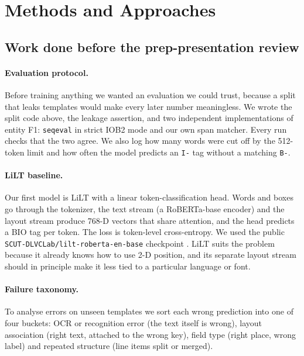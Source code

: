 \documentclass[11pt,a4paper]{article}
\begin{document}
\section{Methods and Approaches}

\subsection{Work done before the prep-presentation review}
\label{sec:before}

\paragraph{Evaluation protocol.} Before training anything we wanted an evaluation we could trust, because a split that leaks templates would make every later number meaningless. We wrote the split code above, the leakage assertion, and two independent implementations of entity F1: \texttt{seqeval} in strict IOB2 mode and our own span matcher. Every run checks that the two agree. We also log how many words were cut off by the 512-token limit and how often the model predicts an \texttt{I-} tag without a matching \texttt{B-}.

\paragraph{LiLT baseline.} Our first model is LiLT with a linear token-classification head. Words and boxes go through the tokenizer, the text stream (a RoBERTa-base encoder) and the layout stream produce 768-D vectors that share attention, and the head predicts a BIO tag per token. The loss is token-level cross-entropy. We used the public \texttt{SCUT-DLVCLab/lilt-roberta-en-base} checkpoint \cite{liltckpt}. LiLT suits the problem because it already knows how to use 2-D position, and its separate layout stream should in principle make it less tied to a particular language or font.

\paragraph{Failure taxonomy.} To analyse errors on unseen templates we sort each wrong prediction into one of four buckets: OCR or recognition error (the text itself is wrong), layout association (right text, attached to the wrong key), field type (right place, wrong label) and repeated structure (line items split or merged).
\end{document}

